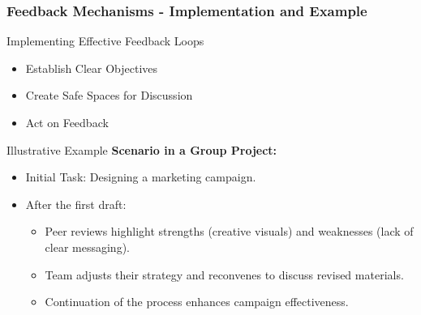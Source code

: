\documentclass[aspectratio=169]{beamer}
\begin{document}
\begin{frame}[fragile]
    \frametitle{Feedback Mechanisms - Implementation and Example}
    
    \begin{block}{Implementing Effective Feedback Loops}
        \begin{itemize}
            \item Establish Clear Objectives
            \item Create Safe Spaces for Discussion
            \item Act on Feedback
        \end{itemize}
    \end{block}

    \begin{block}{Illustrative Example}
        \textbf{Scenario in a Group Project:} 
        \begin{itemize}
            \item Initial Task: Designing a marketing campaign.
            \item After the first draft:
                \begin{itemize}
                    \item Peer reviews highlight strengths (creative visuals) and weaknesses (lack of clear messaging).
                    \item Team adjusts their strategy and reconvenes to discuss revised materials.
                    \item Continuation of the process enhances campaign effectiveness.
                \end{itemize}
        \end{itemize}
    \end{block}
\end{frame}
\end{document}
